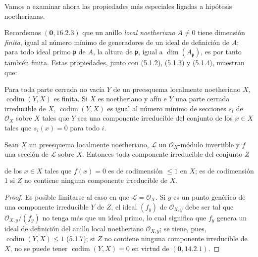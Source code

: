 \begin{env}[5.1.6]
\label{IV.2.5.1.6-fr}
Vamos a examinar ahora las propiedades más especiales ligadas a hipótesis
noetherianas.

Recordemos $(\mathbf{0},16.2.3)$ que un anillo \emph{local noetheriano} $A\ne0$ tiene
dimensión \emph{finita}, igual al número mínimo de generadores de un ideal de
definición de $A$; para todo ideal primo $\mathfrak p$ de $A$, la altura de
$\mathfrak p$, igual a $\dim(A_{\mathfrak p})$, es por tanto también finita.
Estas propiedades, junto con (5.1.2), (5.1.3) y (5.1.4), muestran que:
\end{env}

\begin{proposition}[5.1.7]
\label{IV.2.5.1.7-fr}
Para toda parte cerrada no vacía $Y$ de un preesquema localmente noetheriano
$X$, $\operatorname{codim}(Y,X)$ es finita. Si $X$ es noetheriano y afín e
$Y$ una parte cerrada irreducible de $X$, $\operatorname{codim}(Y,X)$ es
igual al número mínimo de secciones $s_i$ de $\mathcal O_X$ sobre $X$ tales
que $Y$ sea una componente irreducible del conjunto de los $x\in X$ tales que
$s_i(x)=0$ para todo $i$.
\end{proposition}

\begin{corollary}[5.1.8]
\label{IV.2.5.1.8-fr}
Sean $X$ un preesquema localmente noetheriano, $\mathcal L$ un
$\mathcal O_X$-módulo invertible y $f$ una sección de $\mathcal L$ sobre
$X$. Entonces toda componente irreducible del conjunto $Z$


de los $x\in X$ tales que $f(x)=0$ es de codimensión $\leq1$ en $X$; es de
codimensión $1$ si $Z$ no contiene ninguna componente irreducible de $X$.
\end{corollary}

\begin{proof}
Es posible limitarse al caso en que $\mathcal L=\mathcal O_X$. Si $y$ es un
punto genérico de una componente irreducible $Y$ de $Z$, el ideal $(f_y)$ de
$\mathcal O_{X,y}$ debe ser tal que $\mathcal O_{X,y}/(f_y)$ no tenga más que
un ideal primo, lo cual significa que $f_y$ genera un ideal de definición del
anillo local noetheriano $\mathcal O_{X,y}$; se tiene, pues,
$\operatorname{codim}(Y,X)\leq1$ (5.1.7); si $Z$ no contiene ninguna
componente irreducible de $X$, no se puede tener
$\operatorname{codim}(Y,X)=0$ en virtud de $(\mathbf{0},14.2.1)$.
\end{proof}

